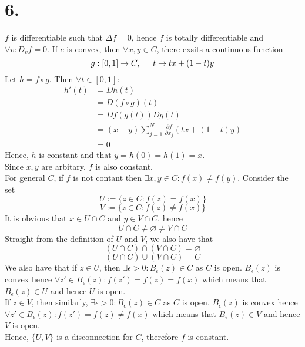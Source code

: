 \documentclass[11pt]{article}
\begin{document}
\section*{6.}
$f$ is differentiable such that $\Delta f = 0$, hence $f$ is totally differentiable and $\forall v: D_vf = 0$. 
If $c$ is convex, then $\forall x,y \in C$, there exsits a continuous function 
\[
g: [0,1] \to C, \indent t \to tx + (1-t)y
\]
Let $h = f \circ g$. Then $\forall t \in [0,1]:$
\begin{equation*}
\begin{aligned}
h'(t) &= Dh(t) \\
&= D(f \circ g)(t) \\
&= Df(g(t)) Dg(t) \\
&= (x-y) \sum_{j=1}^N \frac{\partial f}{\partial x_j} (tx+(1-t)y) \\
&= 0
\end{aligned}
\end{equation*} Hence, $h$ is constant and that $y = h(0) = h(1) = x$. \\
Since $x,y$ are arbitary, $f$ is also constant. \\
For general $C$, if $f$ is not contant then $\exists x,y \in C: f(x) \ne f(y)$. Consider the set 
\[
U:= \{z \in C: f(z) = f(x) \}
\]
\[
V:= \{z \in C: f(z) \ne f(x) \}
\]
It is obvious that $x \in U \cap C$ and $y \in V \cap C$, hence
\[
U \cap C \ne \varnothing \ne V \cap C
\]
Straight from the definition of $U$ and $V$, we also have that
\[
(U \cap C) \cap (V \cap C) = \varnothing
\]
\[
(U \cap C) \cup (V \cap C) = C
\]
We also have that if $z \in U$, then $\exists \epsilon > 0: B_\epsilon(z) \in C$ as $C$ is open. $B_\epsilon(z)$ is convex hence $\forall z' \in B_\epsilon(z): f(z') = f(z) = f(x)$ which means that $B_\epsilon(z) \in U$ and hence $U$ is open. \\
If $z \in V$, then similarly, $\exists \epsilon > 0: B_\epsilon(z) \in C$ as $C$ is open. $B_\epsilon(z)$ is convex hence $\forall z' \in B_\epsilon(z): f(z') = f(z) \ne f(x)$ which means that $B_\epsilon(z) \in V$ and hence $V$ is open. \\
Hence, $\{U,V\}$ is a disconnection for $C$, therefore $f$ is constant.
\end{document}
